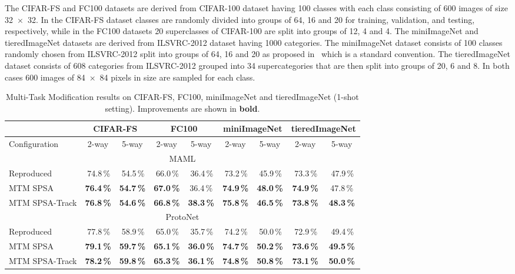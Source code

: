 \documentclass{article}
\begin{document}
The CIFAR-FS and FC100 datasets are derived from CIFAR-100 dataset having 100 classes with each class consisting of 600 images of size 32~×~32. In the CIFAR-FS dataset classes are randomly divided into groups of 64, 16 and 20 for training, validation, and testing, respectively, while in the FC100 datasets 20 superclasses of CIFAR-100 are split into groups of 12, 4 and 4. The miniImageNet and tieredImageNet datasets are derived from ILSVRC-2012 dataset having 1000 categories. The miniImageNet dataset consists of 100 classes randomly chosen from ILSVRC-2012 split into groups of 64, 16 and 20 as proposed in~\cite{Ravi2017OptimizationAA} which is a standard convention. The tieredImageNet dataset consists of 608 categories from ILSVRC-2012 grouped into 34 supercategories that are then split into  groups of 20, 6 and 8. In both cases 600 images of 84~×~84 pixels in size are sampled for each class.

\begin{table*}[th]
	\caption{Multi-Task Modification results on CIFAR-FS, FC100, miniImageNet and tieredImageNet (1-shot setting). Improvements are shown in {\bf bold}.}
	\label{table:all_benchmarks}
	\begin{center}
		\begin{tabular}{|l|c|c|c|c|c|c|c|c|}
	    	\hline
		     & \multicolumn{2}{|c|}{CIFAR-FS} & \multicolumn{2}{c|}{FC100} & \multicolumn{2}{|c|}{miniImageNet} & \multicolumn{2}{c|}{tieredImageNet}\\
			\hline
			Configuration & 2-way & 5-way & 2-way & 5-way & 2-way & 5-way & 2-way & 5-way \\
			\hline
			\multicolumn{9}{|c|}{MAML} \\
			\hline
			Reproduced     & \,74.8\,\%    & \,54.5\,\%    & \,66.0\,\%    & \,36.4\,\%    & \,73.2\,\%    & \,45.9\,\%    & \,73.3\,\%    & \,47.9\,\%   \\
			MTM SPSA       & \bf{76.4\,\%} & \bf{54.7\,\%} & \bf{67.0}\,\% & 36.4\,\%      & \bf{74.9\,\%} & \bf{48.0\,\%} & \bf{74.9}\,\% & 47.8\,\% \\
			MTM SPSA-Track & \bf{76.8\,\%} & \bf{54.6\,\%} & \bf{66.8}\,\% & \bf{38.3\,\%} & \bf{75.8\,\%} & \bf{46.5\,\%} & \bf{73.8}\,\% & \bf{48.3\,\%} \\
			\hline
			\multicolumn{9}{|c|}{ProtoNet} \\
			\hline
			Reproduced     & \,77.8\,\%    & \,58.9\,\%    & \,65.0\,\%    & \,35.7\,\%    & \,74.2\,\%    & \,50.0\,\%    & \,72.9\,\%    & \,49.4\,\%   \\
			MTM SPSA       & \bf{79.1\,\%} & \bf{59.7\,\%} & \bf{65.1}\,\% & \bf{36.0\,\%} & \bf{74.7\,\%} & \bf{50.2\,\%} & \bf{73.6}\,\% & \bf{49.5\,\%} \\
			MTM SPSA-Track & \bf{78.2\,\%} & \bf{59.8\,\%} & \bf{65.3}\,\% & \bf{36.1\,\%} & \bf{74.8\,\%} & \bf{50.8\,\%} & \bf{73.1}\,\% & \bf{50.0\,\%} \\
			\hline
		\end{tabular}
	\end{center}
\end{table*}
\end{document}
